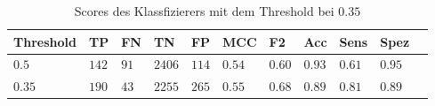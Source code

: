 \begin{table}[htb!]
\begin{center}
\begin{tabular}{lllllllllll}
	\toprule
 	Threshold  & TP & FN & TN & FP & MCC & F2 & Acc & Sens & Spez\\
	\midrule
    $0.5$ & $142$&	$91$ &	$2406$ &	$114$ &	$0.54$ 	&$0.60$	&$0.93$	&$0.61$&	$0.95$ \\
	$0.35$ & $190$ & $43$ &	$2255$ &	$265$ &	$0.55$ &	$0.68$&	$0.89$ &	$0.81$ & $0.89$\\
 \bottomrule
 \end{tabular}
 \end{center}
  \caption{Scores des Klassfizierers mit dem Threshold bei $0.35$}
 \label{tab:final_scores}
 \end{table}

